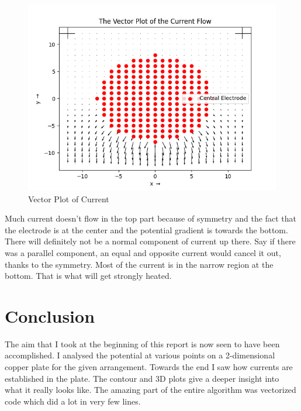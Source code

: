 \documentclass[11pt, a4paper]{article}
\begin{document}
\begin{figure}[!tbh]
   	\centering
  \includegraphics[scale=0.5]{Q6.png} 
    \caption{Vector Plot of Current}
   	\label{fig:vector plot)}
   \end{figure}

Much current doesn't flow in the top part because of symmetry and the fact that the electrode is at the center and the potential gradient is towards the bottom. There will definitely not be a normal component of current up there. Say if there was a parallel component, an equal and opposite current would cancel it out, thanks to the symmetry. Most of the current is in the narrow region at the bottom. That is what will get strongly heated.
  

\section{Conclusion}
 The aim that I took at the beginning of this report is now seen to have been accomplished. I analysed the potential at various points on a 2-dimensional copper plate for the given arrangement. Towards the end I saw how currents are established in the plate. The contour and 3D plots give a deeper insight into what it really looks like. The amazing part of the entire algorithm was vectorized code which did a lot in very few lines.
\end{document}
